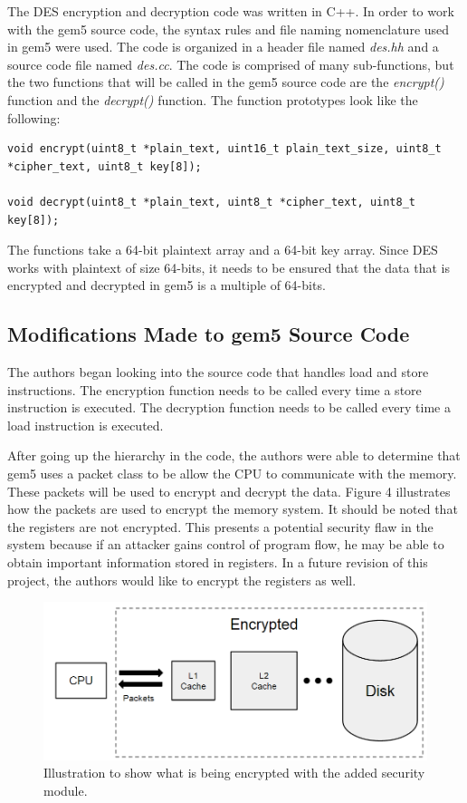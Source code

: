 \documentclass[letterpaper, 10 pt, conference]{ieeeconf}  %
\begin{document}
The DES encryption and decryption code was written in C++.  In order to work with the gem5 source code, the syntax rules and file naming nomenclature used in gem5 were used.  The code is organized in a header file named \emph{des.hh} and a source code file named \emph{des.cc}.  The code is comprised of many sub-functions, but the two functions that will be called in the gem5 source code are the \emph{encrypt()} function and the \emph{decrypt()} function.  The function prototypes look like the following:

\begin{lstlisting}
void encrypt(uint8_t *plain_text, uint16_t plain_text_size, uint8_t *cipher_text, uint8_t key[8]);

void decrypt(uint8_t *plain_text, uint8_t *cipher_text, uint8_t key[8]);
\end{lstlisting}

The functions take a 64-bit plaintext array and a 64-bit key array.  Since DES works with plaintext of size 64-bits, it needs to be ensured that the data that is encrypted and decrypted in gem5 is a multiple of 64-bits.

\subsection{Modifications Made to gem5 Source Code}

The authors began looking into the source code that handles load and store instructions.  The encryption function needs to be called every time a store instruction is executed.  The decryption function needs to be called every time a load instruction is executed.

After going up the hierarchy in the code, the authors were able to determine that gem5 uses a packet class to be allow the CPU to communicate with the memory.  These packets will be used to encrypt and decrypt the data.  Figure 4 illustrates how the packets are used to encrypt the memory system.  It should be noted that the registers are not encrypted.  This presents a potential security flaw in the system because if an attacker gains control of program flow, he may be able to obtain important information stored in registers.  In a future revision of this project, the authors would like to encrypt the registers as well.

\begin{figure}[thpb]
	\centering
	\includegraphics[scale=.35]{gem5}
   \caption{Illustration to show what is being encrypted with the added security module.}
\end{figure}
\end{document}
